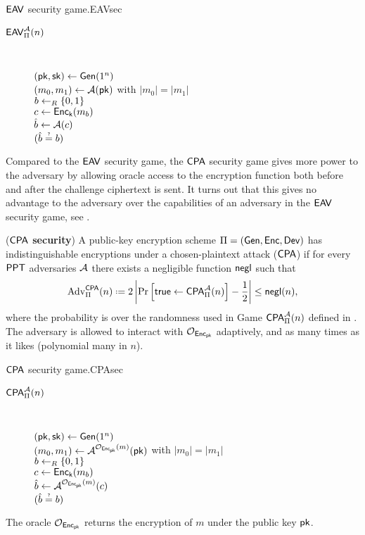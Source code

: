 \begin{boxfigGame}{$\mathsf{EAV}$ security game.}{EAVsec}
  \begin{description}
 	\item[\underline{$\mathsf{EAV}_{\operatorname{\Pi}}^{\mathcal{A}}(n)$}] ~
 	
 		$(\mathsf{pk},\mathsf{sk})\leftarrow\operatorname{\mathsf{Gen}}(1^n)$ \\
 		$(m_0,m_1)\leftarrow \mathcal{A}(\mathsf{pk})$ with $\vert m_0\vert =\vert m_1\vert$ \\
 		$b\leftarrow_R\{0,1\}$ \\
 		$c \leftarrow \operatorname{\mathsf{Enc}}_{\mathsf{k}}(m_b)$ \\
 		$\hat{b}\leftarrow \mathcal{A}(c)$ \\
		\Ret $\askequal{\hat{b}}{b}$ 
		\smallskip
  \end{description}
\end{boxfigGame}


Compared to the $\mathsf{EAV}$ security game, the $\mathsf{CPA}$ security game gives more power to the adversary by allowing oracle access to the encryption function both before and after the challenge ciphertext is sent. It turns out that this gives no advantage to the adversary over the capabilities of an adversary in the $\mathsf{EAV}$ security game, see .

\begin{defn}
(\textbf{$\mathsf{CPA}$ security}) A public-key encryption scheme $\operatorname{\Pi} = (\operatorname{\mathsf{Gen}},\operatorname{\mathsf{Enc}},\operatorname{\mathsf{Dev}})$ has indistinguishable encryptions under a chosen-plaintext attack ($\mathsf{CPA}$) if for every $\mathsf{PPT}$ adversaries $\mathcal{A}$ there exists a negligible function $\operatorname{\mathsf{negl}}$ such that
\begin{align*}
	\adv_{\spkcs}^{\CPA}(n)\defeq 2\left\vert \prob{\true\leftarrow \CPA_{\spkcs}^{\adve}(n)} - \frac{1}{2}\right\vert \leq \negl(n),
\end{align*}
where the probability is over the randomness used in Game $\mathsf{CPA}_{\operatorname{\Pi}}^{\mathcal{A}}(n)$ defined in . The adversary is allowed to interact with $\operatorname{\mathcal{O}}_{\operatorname{\mathsf{Enc}}_{\mathsf{pk}}}$ adaptively, and as many times as it likes (polynomial many in $n$). 
\end{defn}

\begin{boxfigGame}{$\mathsf{CPA}$ security game.}{CPAsec}
  \begin{description}
 	\item[\underline{$\mathsf{CPA}_{\operatorname{\Pi}}^{\mathcal{A}}(n)$}] ~
 	
 		$(\mathsf{pk},\mathsf{sk})\leftarrow\operatorname{\mathsf{Gen}}(1^n)$ \\
 		$(m_0,m_1)\leftarrow \mathcal{A}^{\operatorname{\mathcal{O}}_{\operatorname{\mathsf{Enc}}_{\mathsf{pk}}}(m)}(\mathsf{pk})$ with $\vert m_0\vert =\vert m_1\vert$ \\
 		$b\leftarrow_R\{0,1\}$ \\
 		$c \leftarrow \operatorname{\mathsf{Enc}}_{\mathsf{k}}(m_b)$ \\
 		$\hat{b}\leftarrow \mathcal{A}^{\operatorname{\mathcal{O}}_{\operatorname{\mathsf{Enc}}_{\mathsf{pk}}}(m)}(c)$ \\
		\Ret $\askequal{\hat{b}}{b}$ 
		\smallskip
  \end{description}
  The oracle ${\operatorname{\mathcal{O}}_{\operatorname{\mathsf{Enc}}_{\mathsf{pk}}}}$ returns the encryption of $m$ under the public key $\mathsf{pk}$. 
\end{boxfigGame}

